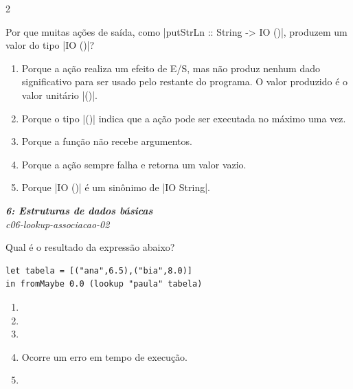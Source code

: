 \documentclass[a4paper,10pt,brazil]{article}
\begin{document}
\begin{multicols}{2}
\begin{flushright}
\end{flushright}
Por que muitas ações de saída, como \haskellinline|putStrLn :: String -> IO ()|, produzem um valor do tipo \haskellinline|IO ()|?

\begin{enumerate}
  \item Porque a ação realiza um efeito de E/S, mas não produz nenhum dado significativo para ser usado pelo restante do programa. O valor produzido é o valor unitário \haskellinline|()|.

  \item Porque o tipo \haskellinline|()| indica que a ação pode ser executada no máximo uma vez.

  \item Porque a função não recebe argumentos.

  \item Porque a ação sempre falha e retorna um valor vazio.

  \item Porque \haskellinline|IO ()| é um sinônimo de \haskellinline|IO String|.


\end{enumerate}

\begin{flushright}
  \footnotesize
  \textit{\textbf{6: Estruturas de dados básicas}}\\
  \textit{c06-lookup-associacao-02}\\

\end{flushright}
Qual é o resultado da expressão abaixo?
\begin{verbatim}
let tabela = [("ana",6.5),("bia",8.0)]
in fromMaybe 0.0 (lookup "paula" tabela)
\end{verbatim}

\begin{enumerate}
  \item {}

  \item {}

  \item {}

  \item Ocorre um erro em tempo de execução.

  \item {}


\end{enumerate}


\end{multicols}
\end{document}
